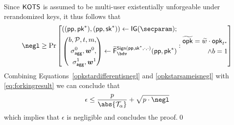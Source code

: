 Since $\mathsf{KOTS}$ is assumed to be multi-user existentially unforgeable under rerandomized keys, it thus follows that
  \begin{equation}
    \negl \geq \Pr\left[
      \begin{aligned}
      ((\params,\pk^*),(\params,\sk^*)) \gets \IG(\secparam);\\
      \left(\begin{aligned}b,\pubkeys,t,m,\\\aggsig^0,\vec{w}^0,\\\aggsig^1,\vec{w}^1\end{aligned}\right)\gets \widetilde\fork^{\sign(\params,\sk^*,\cdot,\cdot)}_\bdv(\params,\pk^*)\\
      \end{aligned}:
      \begin{aligned}
        \widetilde \opk = \widetilde w\cdot\opk_{t^*}\\
        \land b=1
      \end{aligned}
    \right]\label{opkstarsameisnegl}
  \end{equation}
  Combining Equations~\ref{opkstardifferentisnegl} and \ref{opkstarsameisnegl} with \autoref{eq:forkingresult} we can conclude that
  \[
    \epsilon \leq \frac{p}{\abs{\tern_\alpha}} + \sqrt{p\cdot\negl}
  \]
  which implies that $\epsilon$ is negligible and concludes the proof.\qed
  \fi
